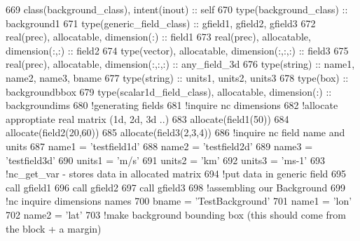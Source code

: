 \begin{DoxyCode}
669     \textcolor{keywordtype}{class}(background\_class), \textcolor{keywordtype}{intent(inout)} :: self
670     \textcolor{keywordtype}{type}(background\_class) :: background1
671     \textcolor{keywordtype}{type}(generic\_field\_class) :: gfield1, gfield2, gfield3
672     \textcolor{keywordtype}{real(prec)}, \textcolor{keywordtype}{allocatable}, \textcolor{keywordtype}{dimension(:)} :: field1
673     \textcolor{keywordtype}{real(prec)}, \textcolor{keywordtype}{allocatable}, \textcolor{keywordtype}{dimension(:,:)} :: field2
674     \textcolor{keywordtype}{type}(vector), \textcolor{keywordtype}{allocatable}, \textcolor{keywordtype}{dimension(:,:,:)} :: field3
675     \textcolor{keywordtype}{real(prec)}, \textcolor{keywordtype}{allocatable}, \textcolor{keywordtype}{dimension(:,:,:)} :: any\_field\_3d
676     \textcolor{keywordtype}{type}(string) :: name1, name2, name3, bname
677     \textcolor{keywordtype}{type}(string) :: units1, units2, units3
678     \textcolor{keywordtype}{type}(box) :: backgroundbbox
679     \textcolor{keywordtype}{type}(scalar1d\_field\_class), \textcolor{keywordtype}{allocatable}, \textcolor{keywordtype}{dimension(:)} :: backgroundims
680     \textcolor{comment}{!generating fields}
681     \textcolor{comment}{!inquire nc dimensions}
682     \textcolor{comment}{!allocate approptiate real matrix (1d, 2d, 3d ..)}
683     \textcolor{keyword}{allocate}(field1(50))
684     \textcolor{keyword}{allocate}(field2(20,60))
685     \textcolor{keyword}{allocate}(field3(2,3,4))
686     \textcolor{comment}{!inquire nc field name and units}
687     name1 = \textcolor{stringliteral}{'testfield1d'}
688     name2 = \textcolor{stringliteral}{'testfield2d'}
689     name3 = \textcolor{stringliteral}{'testfield3d'}
690     units1 = \textcolor{stringliteral}{'m/s'}
691     units2 = \textcolor{stringliteral}{'km'}
692     units3 = \textcolor{stringliteral}{'ms-1'}
693     \textcolor{comment}{!nc\_get\_var - stores data in allocated matrix}
694     \textcolor{comment}{!put data in generic field}
695     \textcolor{keyword}{call }gfield1%
696     \textcolor{keyword}{call }gfield2%
697     \textcolor{keyword}{call }gfield3%
698     \textcolor{comment}{!assembling our Background}
699     \textcolor{comment}{!nc inquire dimensions names}
700     bname = \textcolor{stringliteral}{'TestBackground'}
701     name1 = \textcolor{stringliteral}{'lon'}
702     name2 = \textcolor{stringliteral}{'lat'}
703     \textcolor{comment}{!make background bounding box (this should come from the block + a margin)}

\end{DoxyCode}
